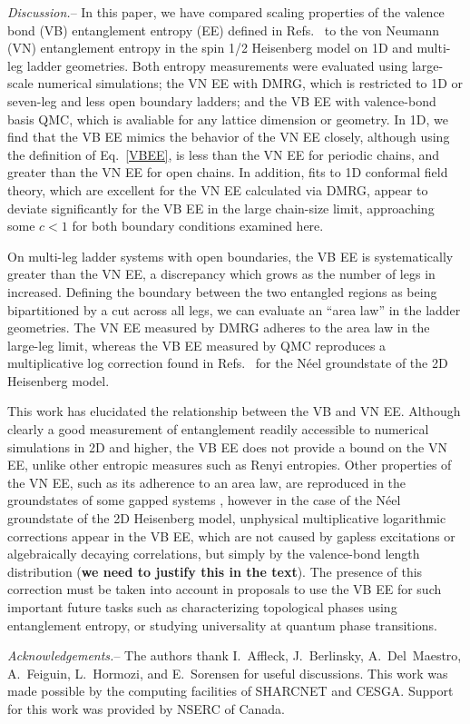 \documentclass[prl,aps,twocolumn,floatfix,amsmath,amssymb,superscriptaddress,tightenlines]{revtex4}
\begin{document}
{\it Discussion.}-- In this paper, we have compared scaling properties of
the valence bond (VB) entanglement entropy (EE) defined in
Refs.~\cite{Alet,Chh} to the von Neumann (VN) entanglement entropy in the
spin 1/2 Heisenberg model on 1D and multi-leg ladder geometries.  Both
entropy measurements were evaluated using large-scale numerical
simulations; the VN EE with DMRG, which is restricted to 1D or seven-leg
and less open boundary ladders; and the VB EE with valence-bond basis QMC,
which is avaliable for any lattice dimension or geometry. In 1D, we find
that the VB EE mimics the behavior of the VN EE closely, although using
the definition of Eq.~\eqref{VBEE}, is less than the VN EE for periodic
chains, and greater than the VN EE for open chains. In addition, fits to
1D conformal field theory, which are excellent for the VN EE calculated
via DMRG, appear to deviate significantly for the VB EE in the large
chain-size limit, approaching some $c<1$ for both boundary conditions
examined here.

On multi-leg ladder systems with open boundaries, the VB EE is
systematically greater than the VN EE, a discrepancy which grows as the
number of legs in increased.  Defining the boundary between the two
entangled regions as being bipartitioned by a cut across all legs, we can
evaluate an ``area law'' in the ladder geometries.  The VN EE measured by
DMRG adheres to the area law in the large-leg limit, whereas the VB EE
measured by QMC reproduces a multiplicative log correction found in
Refs.~\cite{Alet,Chh} for the N\'eel groundstate of the 2D Heisenberg
model.

This work has elucidated the relationship between the VB and VN EE.
Although clearly a good measurement of entanglement readily accessible to
numerical simulations in 2D and higher, the VB EE does not provide a bound
on the VN EE, unlike other entropic measures such as Renyi entropies.
Other properties of the VN EE, such as its adherence to an area law, are
reproduced in the groundstates of some gapped systems \cite{Alet,Chh},
however in the case of the N\'eel groundstate of the 2D Heisenberg model,
unphysical multiplicative logarithmic corrections appear in the VB EE,
which are not caused by gapless excitations or algebraically decaying
correlations, but simply by the valence-bond length distribution ({\bf we
need to justify this in the text}).  The presence of this correction must
be taken into account in proposals to use the VB EE for such important
future tasks such as characterizing topological phases using entanglement
entropy, or studying universality at quantum phase transitions.

{\it Acknowledgements.}-- The authors thank I.~Affleck, J.~Berlinsky,
A.~Del~Maestro, A.~Feiguin, L.~Hormozi, and E.~Sorensen for useful
discussions.  This work was made possible by the computing facilities of
SHARCNET and CESGA.  Support for this work was provided by NSERC of
Canada.


\end{document}
